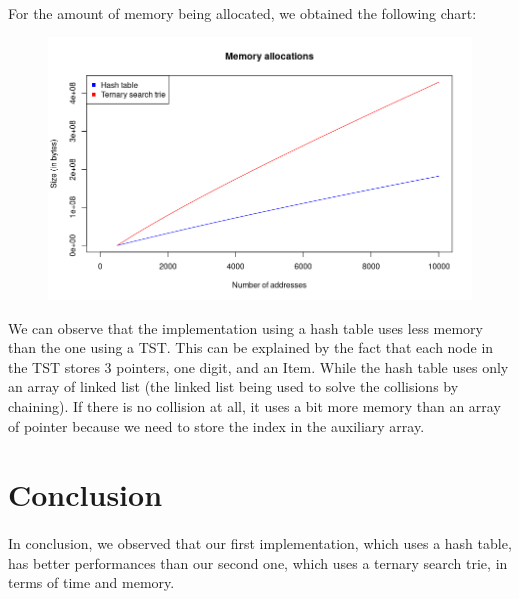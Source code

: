 \documentclass[a4paper, 11pt, oneside]{article}
\begin{document}
\paragraph{}For the amount of memory being allocated, we obtained the following chart:
\begin{figure}[H]
  \centering
  \includegraphics[scale=.5]{plots/mem.png}
\end{figure}
We can observe that the implementation using a hash table uses less memory than the one using a TST. This can be explained by the fact that each node in the TST stores 3 pointers, one digit, and an Item. While the hash table uses only an array of linked list (the linked list being used to solve the collisions by chaining). If there is no collision at all, it uses a bit more memory than an array of pointer because we need to store the index in the auxiliary array.

\section{Conclusion}
\paragraph{}In conclusion, we observed that our first implementation, which uses a hash table, has better performances than our second one, which uses a ternary search trie, in terms of time and memory.
\end{document}
